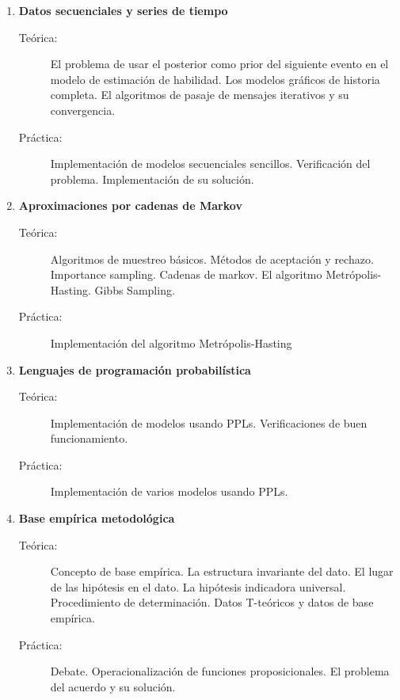 \documentclass[10pt]{article}
\begin{document}
\begin{enumerate}

\vspace{0.1cm}
\item \textbf{Datos secuenciales y series de tiempo}
\vspace{-0.15cm}
\begin{description}
\item[Teórica:] El problema de usar el posterior como prior del siguiente evento en el modelo de estimación de habilidad. Los modelos gráficos de historia completa. El algoritmos de pasaje de mensajes iterativos y su convergencia.
\item[Práctica:] Implementación de modelos secuenciales sencillos. Verificación del problema. Implementación de su solución.
\end{description}


\vspace{0.1cm}
\item \textbf{Aproximaciones por cadenas de Markov}
\vspace{-0.15cm}
\begin{description}
\item[Teórica:] Algoritmos de muestreo básicos. Métodos de aceptación y rechazo. Importance sampling. Cadenas de markov. El algoritmo Metrópolis-Hasting. Gibbs Sampling.
\item[Práctica:] Implementación del algoritmo Metrópolis-Hasting
\end{description}


\vspace{0.1cm}
\item \textbf{Lenguajes de programación probabilística}
\vspace{-0.15cm}
\begin{description}
\item[Teórica:] Implementación de modelos usando PPLs. Verificaciones de buen funcionamiento. 
\item[Práctica:] Implementación de varios modelos usando PPLs.
\end{description}


\vspace{0.1cm}
\item \textbf{Base empírica metodológica}
\vspace{-0.15cm}
\begin{description}
\item[Teórica:] Concepto de base empírica. La estructura invariante del dato. El lugar de las hipótesis en el dato. La hipótesis indicadora universal. Procedimiento de determinación. Datos T-teóricos y datos de base empírica.
\item[Práctica:] Debate. Operacionalización de funciones proposicionales. El problema del acuerdo y su solución.


\end{description}

\end{enumerate}
\end{document}

